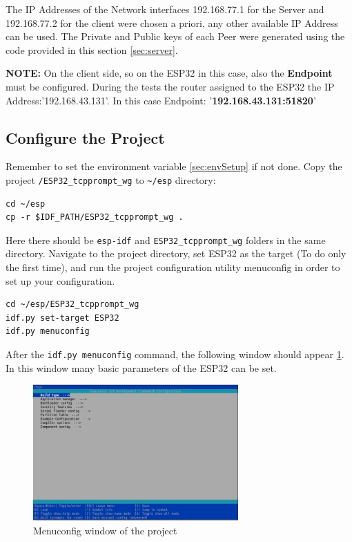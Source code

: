 The IP Addresses of the Network interfaces 192.168.77.1 for the Server and 192.168.77.2 for the client 
were chosen a priori, any other available IP Address can be used. The Private and Public keys of each Peer were generated using the code provided in this section \ref{sec:server}.

\textbf{NOTE:} On the client side, so on the ESP32 in this case, also the \textbf{Endpoint} must be configured. During the tests 
the router assigned to the ESP32 the IP Address:'192.168.43.131'. In this case Endpoint: '\textbf{192.168.43.131:51820}'

\subsection{Configure the Project}
Remember to set the environment variable \ref{sec:envSetup} if not done.
Copy the project \texttt{/ESP32\_tcpprompt\_wg}  to \texttt{\textasciitilde /esp} directory:

\begin{lstlisting}
cd ~/esp
cp -r $IDF_PATH/ESP32_tcpprompt_wg .
\end{lstlisting}

Here there should be \texttt{esp-idf} and \texttt{ESP32\_tcpprompt\_wg} folders in the same directory.
Navigate to the project directory, set ESP32 as the target (To do only the first time), and run the project configuration utility menuconfig in order to set up your configuration.

\begin{lstlisting}
cd ~/esp/ESP32_tcpprompt_wg
idf.py set-target ESP32
idf.py menuconfig
\end{lstlisting}

After the \texttt{idf.py menuconfig} command, the following window should appear \ref{fig:menuConfig}.
In this window many basic parameters of the ESP32 can be set.

\begin{figure}[H]
    \vspace{0.4cm}
    \centering
    \includegraphics[width=0.7\textwidth]{images/menuConfig.png}
    \caption{Menuconfig window of the project}
    \label{fig:menuConfig} %
\end{figure}

